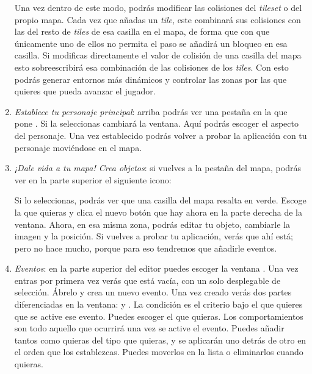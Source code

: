 \begin{enumerate}
		
	Una vez dentro de este modo, podrás modificar las colisiones del \textit{tileset} o del propio mapa. Cada vez que añadas un \textit{tile}, este combinará sus colisiones con las del resto de \textit{tiles} de esa casilla en el mapa, de forma que con que únicamente uno de ellos no permita el paso se añadirá un bloqueo en esa casilla. Si modificas directamente el valor de colisión de una casilla del mapa esto sobreescribirá esa combinación de las colisiones de los \textit{tiles}. Con esto podrás generar entornos más dinámicos y controlar las zonas por las que quieres que pueda avanzar el jugador.
	
	
	\item \textit{Establece tu personaje principal}: arriba podrás ver una pestaña en la que pone . Si la seleccionas cambiará la ventana. Aquí podrás escoger el aspecto del personaje. Una vez establecido podrás volver a probar la aplicación con tu personaje moviéndose en el mapa.
	
	
	\item \textit{¡Dale vida a tu mapa! Crea objetos}: si vuelves a la pestaña del mapa, podrás ver en la parte superior el siguiente icono:
	
	
	Si lo seleccionas, podrás ver que una casilla del mapa resalta en verde. Escoge la que quieras y clica el nuevo botón  que hay ahora en la parte derecha de la ventana. Ahora, en esa misma zona, podrás editar tu objeto, cambiarle la imagen y la posición. Si vuelves a probar tu aplicación, verás que ahí está; pero no hace mucho, porque para eso tendremos que añadirle eventos.
	
	
	\item \textit{Eventos}: en la parte superior del editor puedes escoger la ventana . Una vez entras por primera vez verás que está vacía, con un solo desplegable de selección. Ábrelo y crea un nuevo evento. Una vez creado verás dos partes diferenciadas en la ventana:  y . La condición es el criterio bajo el que quieres que se active ese evento. Puedes escoger el que quieras. Los comportamientos son todo aquello que ocurrirá una vez se active el evento. Puedes añadir tantos como quieras del tipo que quieras, y se aplicarán uno detrás de otro en el orden que los establezcas. Puedes moverlos en la lista o eliminarlos cuando quieras.
	

\end{enumerate}
